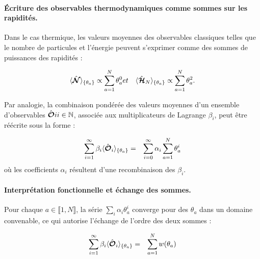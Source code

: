 



\paragraph{Écriture des observables thermodynamiques comme sommes sur les rapidités.}

Dans le cas thermique, les valeurs moyennes des observables classiques telles que le nombre de particules et l'énergie peuvent s'exprimer comme des sommes de puissances des rapidités :

\begin{eqnarray*}
	\langle \hat{\bm{\mathcal{N}}} \rangle_{\{ \theta_a\} } \propto \sum_{a = 1}^N \theta_a^0  & et & \langle \hat{\bm{\mathcal{H}}}_N \rangle_{\{ \theta_a\} } \propto \sum_{a = 1}^N \theta_a^2 .	
\end{eqnarray*}

Par analogie, la combinaison pondérée des valeurs moyennes d’un ensemble d’observables ${ \hat{\bm{\mathcal{O}}}i }{i \in \mathbb{N}}$, associée aux multiplicateurs de Lagrange ${ \beta_i }$, peut être réécrite sous la forme :

\begin{eqnarray}
	\sum_{i = 1}^\infty  \beta_i \langle \hat{\bm{\mathcal{O}}}_i \rangle_{ \{\theta_a \} } & = & \sum_{i = 0}^\infty \alpha_i \sum_{a = 1 }^N \theta_a^i		
\end{eqnarray}
où les coefficients $\alpha_i$ résultent d’une recombinaison des $\beta_i$.

\paragraph{Interprétation fonctionnelle et échange des sommes.}
	
Pour chaque $a \in \llbracket 1, N \rrbracket$, la série $\sum_i \alpha_i \theta_a^i$ converge pour des $\theta_a$ dans un domaine convenable, ce qui autorise l’échange de l’ordre des deux sommes : 
	
\begin{eqnarray}
	\sum_{i = 1}^\infty  \beta_i \langle \hat{\bm{\mathcal{O}}}_i \rangle_{ \{\theta_a \} } & = & \sum_{a = 1 }^N  w(\theta_a) 
\end{eqnarray}
	
